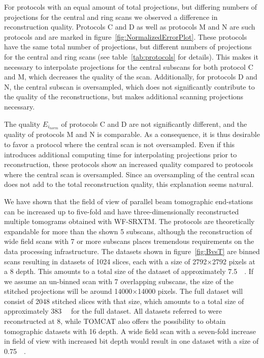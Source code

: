 For protocols with an equal amount of total projections, but differing numbers of projections for the central and ring scans we observed a difference in reconstruction quality. Protocols C and D as well as protocols M and N are such protocols and are marked in figure~\ref{fig:NormalizedErrorPlot}. These protocols have the same total number of projections, but different numbers of projections for the central and ring scans (see table~\ref{tab:protocols} for details). This makes it necessary to interpolate projections for the central subscans for both protocol C and M, which decreases the quality of the scan. Additionally, for protocols D and N, the central subscan is oversampled, which does not significantly contribute to the quality of the reconstructions, but makes additional scanning projections necessary. 

The quality $E_{i_{norm}}$ of protocols C and D are not significantly different, and the quality of protocols M and N is comparable. As a consequence, it is thus desirable to favor a protocol where the central scan is not oversampled. Even if this introduces additional computing time for interpolating projections prior to reconstruction, these protocols show an increased quality compared to protocols where the central scan is oversampled. Since an oversampling of the central scan does not add to the total reconstruction quality, this explanation seems natural.

We have shown that the field of view of parallel beam tomographic end-stations can be increased up to five-fold and have three-dimensionally reconstructed multiple tomograms obtained with WF-SRXTM. The protocols are theoretically expandable for more than the shown 5 subscans, although the reconstruction of wide field scans with 7 or more subscans places tremendous requirements on the data processing infrastructure. The datasets shown in figure~\ref{fig:BvsT} are binned scans resulting in datasets of 1024 slices, each with a size of 2792$\times$2792 pixels at a \SI{8}{\bit} depth. This amounts to a total size of the dataset of approximately \SI{7.5}{\giga\byte}. If we assume an un-binned scan with 7 overlapping subscans, the size of the stitched projections will be around 14000$\times$14000 pixels. The full dataset will consist of 2048 stitched slices with that size, which amounts to a total size of approximately \SI{383}{\giga\byte} for the full dataset. All datasets referred to were reconstructed at \SI{8}{\bit}, while TOMCAT also offers the possibility to obtain tomographic datasets with \SI{16}{\bit} depth. A wide field scan with a seven-fold increase in field of view with increased bit depth would result in one dataset with a size of \SI{0.75}{\tera\byte}.

